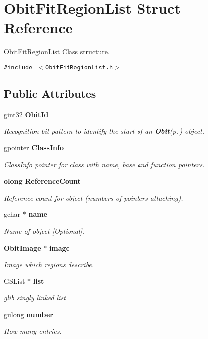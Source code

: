 \section{Obit\-Fit\-Region\-List Struct Reference}
\label{structObitFitRegionList}
Obit\-Fit\-Region\-List Class structure.  


{\tt \#include $<$Obit\-Fit\-Region\-List.h$>$}

\subsection*{Public Attributes}
\begin{CompactItemize}
\item 
gint32 {\bf Obit\-Id}
\begin{CompactList}\small\item\em Recognition bit pattern to identify the start of an {\bf Obit}{\rm (p.\,\pageref{structObit})} object. \item\end{CompactList}\item 
gpointer {\bf Class\-Info}
\begin{CompactList}\small\item\em Class\-Info pointer for class with name, base and function pointers. \item\end{CompactList}\item 
{\bf olong} {\bf Reference\-Count}
\begin{CompactList}\small\item\em Reference count for object (numbers of pointers attaching). \item\end{CompactList}\item 
gchar $\ast$ {\bf name}
\begin{CompactList}\small\item\em Name of object [Optional]. \item\end{CompactList}\item 
{\bf Obit\-Image} $\ast$ {\bf image}
\begin{CompactList}\small\item\em Image which regions describe. \item\end{CompactList}\item 
GSList $\ast$ {\bf list}
\begin{CompactList}\small\item\em glib singly linked list \item\end{CompactList}\item 
gulong {\bf number}
\begin{CompactList}\small\item\em How many entries. \item\end{CompactList}\end{CompactItemize}


